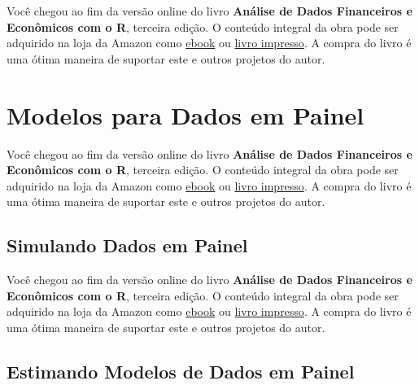 \documentclass[
  11pt,
]{book}
\newenvironment{pleasebuyit}
{\begin{noteblock}
		
	} {\end{noteblock}}
\begin{document}
\begin{pleasebuyit}
Você chegou ao fim da versão online do livro \textbf{Análise de Dados
Financeiros e Econômicos com o R}, terceira edição. O conteúdo integral
da obra pode ser adquirido na loja da Amazon como
\href{https://www.amazon.com.br/dp/B08WNC27ZY}{ebook} ou
\href{https://www.amazon.com/dp/B08WP8CCDB}{livro impresso}. A compra do
livro é uma ótima maneira de suportar este e outros projetos do autor.
\end{pleasebuyit}

\hypertarget{modelos-para-dados-em-painel}{%
\section{Modelos para Dados em Painel}\label{modelos-para-dados-em-painel}}

\begin{pleasebuyit}
Você chegou ao fim da versão online do livro \textbf{Análise de Dados
Financeiros e Econômicos com o R}, terceira edição. O conteúdo integral
da obra pode ser adquirido na loja da Amazon como
\href{https://www.amazon.com.br/dp/B08WNC27ZY}{ebook} ou
\href{https://www.amazon.com/dp/B08WP8CCDB}{livro impresso}. A compra do
livro é uma ótima maneira de suportar este e outros projetos do autor.
\end{pleasebuyit}

\hypertarget{simulando-dados-em-painel}{%
\subsection{Simulando Dados em Painel}\label{simulando-dados-em-painel}}

\begin{pleasebuyit}
Você chegou ao fim da versão online do livro \textbf{Análise de Dados
Financeiros e Econômicos com o R}, terceira edição. O conteúdo integral
da obra pode ser adquirido na loja da Amazon como
\href{https://www.amazon.com.br/dp/B08WNC27ZY}{ebook} ou
\href{https://www.amazon.com/dp/B08WP8CCDB}{livro impresso}. A compra do
livro é uma ótima maneira de suportar este e outros projetos do autor.
\end{pleasebuyit}

\hypertarget{estimando-modelos-de-dados-em-painel}{%
\subsection{Estimando Modelos de Dados em Painel}\label{estimando-modelos-de-dados-em-painel}}
\end{document}

